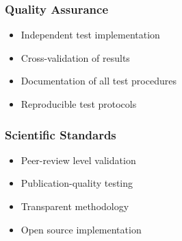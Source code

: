 \subsubsection{Quality Assurance}
\begin{itemize}
    \item Independent test implementation
    \item Cross-validation of results
    \item Documentation of all test procedures
    \item Reproducible test protocols
\end{itemize}

\subsubsection{Scientific Standards}
\begin{itemize}
    \item Peer-review level validation
    \item Publication-quality testing
    \item Transparent methodology
    \item Open source implementation
\end{itemize}
